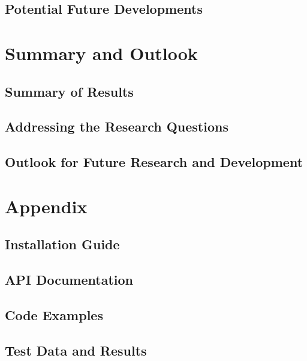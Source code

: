 \documentclass{article}
\begin{document}
\subsection{Potential Future Developments}

\newpage

\section{Summary and Outlook}

\subsection{Summary of Results}
\subsection{Addressing the Research Questions}
\subsection{Outlook for Future Research and Development}

\newpage

\newpage

\appendix
\section*{Appendix}
\subsection*{Installation Guide}
\subsection*{API Documentation}
\subsection*{Code Examples}
\subsection*{Test Data and Results}

\nocite{*}



\end{document}
